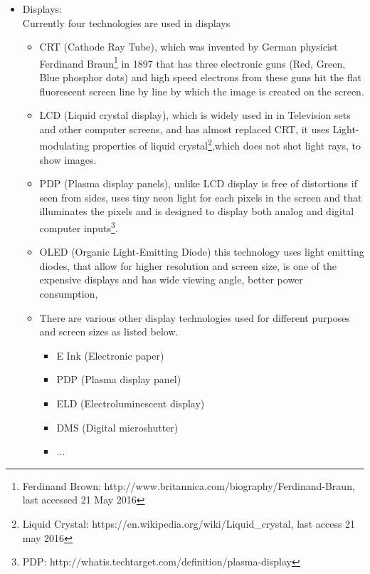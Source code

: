 \begin{itemize}

\item Displays: \\
Currently four technologies are used in displays 

\begin{itemize}
\item CRT (Cathode Ray Tube), which was invented by German physicist Ferdinand Braun\footnote{Ferdinand Brown: 
http://www.britannica.com/biography/Ferdinand-Braun, last accessed 21 May 2016} in 1897 that has three electronic guns (Red, Green, Blue phosphor dots) and high speed electrons  from these guns hit the flat fluorescent screen line by line by which the image is created on the screen.  

\item LCD (Liquid crystal display), which is widely used in in Television sets and other computer screens, and has almost replaced CRT, it uses Light-modulating properties of liquid crystal\footnote{Liquid Crystal: https://en.wikipedia.org/wiki/Liquid\_crystal, last access 21 may 2016},which does not shot light rays, to show images. 

\item PDP (Plasma display panels), unlike LCD display is free of distortions if seen from sides, uses tiny neon light for each pixels in the screen and that illuminates the pixels and is designed to display both analog and digital computer inputs\footnote{PDP: http://whatis.techtarget.com/definition/plasma-display}.

\item OLED (Organic Light-Emitting Diode) this technology uses light emitting diodes, that allow for higher resolution and screen size, is one of the expensive displays and has wide viewing angle, better power consumption,


\item There are various other display technologies used for different purposes and screen sizes as listed below.

\begin{itemize}
\item E Ink (Electronic paper)
\item PDP (Plasma display panel)
\item ELD (Electroluminescent display)
\item DMS (Digital microshutter)
\item ...

\end{itemize}


\end{itemize}
\end{itemize}
